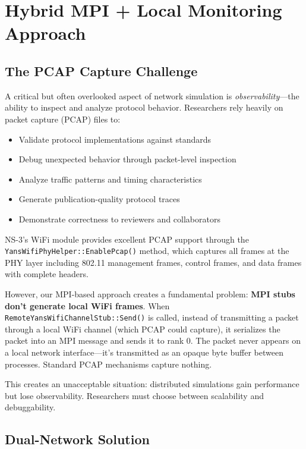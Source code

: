 \section{Hybrid MPI + Local Monitoring Approach}
\label{sec:hybrid}

\subsection{The PCAP Capture Challenge}

A critical but often overlooked aspect of network simulation is \textit{observability}—the ability to inspect and analyze protocol behavior. Researchers rely heavily on packet capture (PCAP) files to:

\begin{itemize}
    \item Validate protocol implementations against standards
    \item Debug unexpected behavior through packet-level inspection
    \item Analyze traffic patterns and timing characteristics
    \item Generate publication-quality protocol traces
    \item Demonstrate correctness to reviewers and collaborators
\end{itemize}

NS-3's WiFi module provides excellent PCAP support through the \texttt{YansWifiPhyHelper::EnablePcap()} method, which captures all frames at the PHY layer including 802.11 management frames, control frames, and data frames with complete headers.

However, our MPI-based approach creates a fundamental problem: \textbf{MPI stubs don't generate local WiFi frames}. When \texttt{RemoteYansWifiChannelStub::Send()} is called, instead of transmitting a packet through a local WiFi channel (which PCAP could capture), it serializes the packet into an MPI message and sends it to rank 0. The packet never appears on a local network interface—it's transmitted as an opaque byte buffer between processes. Standard PCAP mechanisms capture nothing.

This creates an unacceptable situation: distributed simulations gain performance but lose observability. Researchers must choose between scalability and debuggability.

\subsection{Dual-Network Solution}

